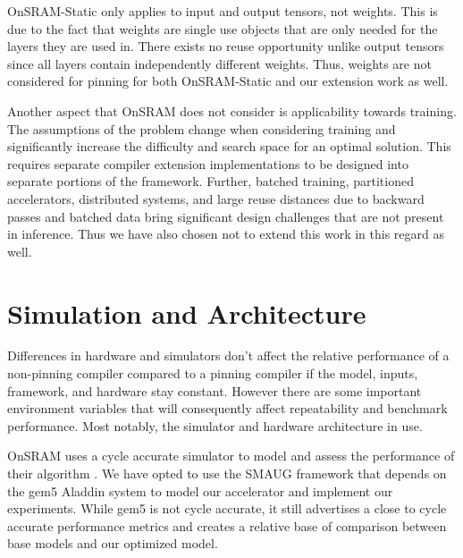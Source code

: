 OnSRAM-Static only applies to input and output tensors, not weights. This is
due to the fact that weights are single use objects that are only needed for
the layers they are used in. There exists no reuse opportunity unlike output
tensors since all layers contain independently different weights. Thus, weights
are not considered for pinning for both OnSRAM-Static and our extension work as
well.

Another aspect that OnSRAM does not consider is applicability towards training.
The assumptions of the problem change when considering training and
significantly increase the difficulty and search space for an optimal solution.
This requires separate compiler extension implementations to be designed into
separate portions of the framework. Further, batched training, partitioned
accelerators, distributed systems, and large reuse distances due to backward
passes and batched data \cite{onsram} bring significant design challenges that
are not present in inference. Thus we have also chosen not to extend this work
in this regard as well.


\section{Simulation and Architecture}

Differences in hardware and simulators don't affect the relative performance of
a non-pinning compiler compared to a pinning compiler if the model, inputs,
framework, and hardware stay constant. However there are some important
environment variables that will consequently affect repeatability and benchmark
performance. Most notably, the simulator and hardware architecture in use.

OnSRAM uses a cycle accurate simulator to model and assess the performance of
their algorithm \cite{onsram}.  We have opted to use the SMAUG\cite{smaug}
framework that depends on the gem5 Aladdin\cite{aladdin} system to model our
accelerator and implement our experiments.
While gem5 is not cycle accurate, it still advertises a close to cycle accurate
performance metrics and creates a relative base of comparison between base
models and our optimized model.


